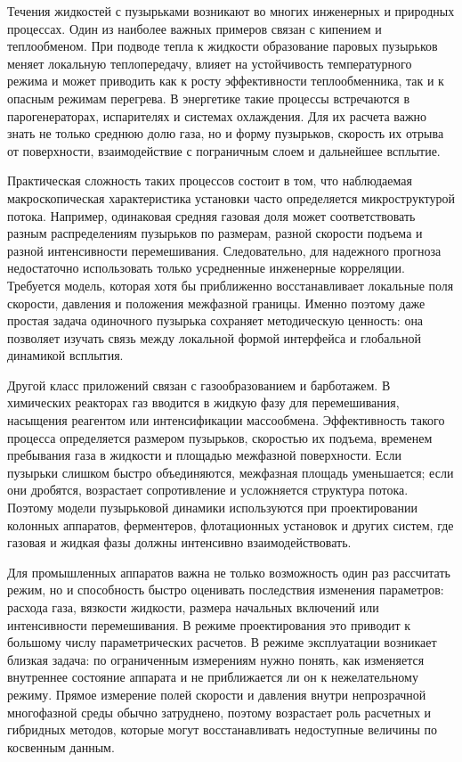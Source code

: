 \documentclass[12pt,a4paper]{article}
\begin{document}
Течения жидкостей с пузырьками возникают во многих инженерных и природных
процессах. Один из наиболее важных примеров связан с кипением и теплообменом.
При подводе тепла к жидкости образование паровых пузырьков меняет локальную
теплопередачу, влияет на устойчивость температурного режима и может приводить
как к росту эффективности теплообменника, так и к опасным режимам перегрева.
В энергетике такие процессы встречаются в парогенераторах, испарителях и
системах охлаждения. Для их расчета важно знать не только среднюю долю газа, но
и форму пузырьков, скорость их отрыва от поверхности, взаимодействие с
пограничным слоем и дальнейшее всплытие.

Практическая сложность таких процессов состоит в том, что наблюдаемая
макроскопическая характеристика установки часто определяется микроструктурой
потока. Например, одинаковая средняя газовая доля может соответствовать разным
распределениям пузырьков по размерам, разной скорости подъема и разной
интенсивности перемешивания. Следовательно, для надежного прогноза
недостаточно использовать только усредненные инженерные корреляции. Требуется
модель, которая хотя бы приближенно восстанавливает локальные поля скорости,
давления и положения межфазной границы. Именно поэтому даже простая задача
одиночного пузырька сохраняет методическую ценность: она позволяет изучать
связь между локальной формой интерфейса и глобальной динамикой всплытия.

Другой класс приложений связан с газообразованием и барботажем. В химических
реакторах газ вводится в жидкую фазу для перемешивания, насыщения реагентом или
интенсификации массообмена. Эффективность такого процесса определяется
размером пузырьков, скоростью их подъема, временем пребывания газа в жидкости и
площадью межфазной поверхности. Если пузырьки слишком быстро объединяются,
межфазная площадь уменьшается; если они дробятся, возрастает сопротивление и
усложняется структура потока. Поэтому модели пузырьковой динамики используются
при проектировании колонных аппаратов, ферментеров, флотационных установок и
других систем, где газовая и жидкая фазы должны интенсивно взаимодействовать.

Для промышленных аппаратов важна не только возможность один раз рассчитать
режим, но и способность быстро оценивать последствия изменения параметров:
расхода газа, вязкости жидкости, размера начальных включений или интенсивности
перемешивания. В режиме проектирования это приводит к большому числу
параметрических расчетов. В режиме эксплуатации возникает близкая задача: по
ограниченным измерениям нужно понять, как изменяется внутреннее состояние
аппарата и не приближается ли он к нежелательному режиму. Прямое измерение
полей скорости и давления внутри непрозрачной многофазной среды обычно
затруднено, поэтому возрастает роль расчетных и гибридных методов, которые
могут восстанавливать недоступные величины по косвенным данным.
\end{document}
